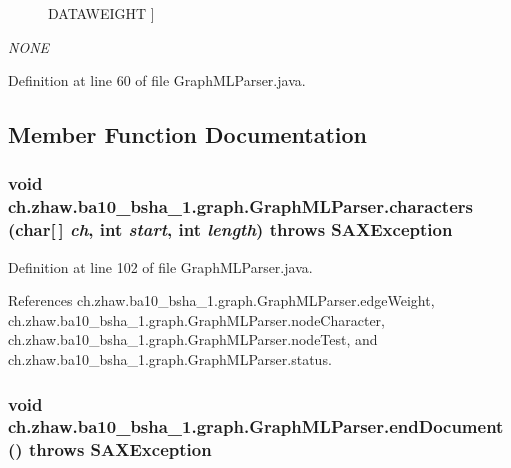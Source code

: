 \begin{Desc}
\begin{description}
{\hypertarget{classch_1_1zhaw_1_1ba10__bsha__1_1_1graph_1_1GraphMLParser_aaf3d4942a1edfa4a19addb2f2c0cdb9c}{
DATAWEIGHT}
\label{classch_1_1zhaw_1_1ba10__bsha__1_1_1graph_1_1GraphMLParser_aaf3d4942a1edfa4a19addb2f2c0cdb9c}
}]\item[{\em 
\hypertarget{classch_1_1zhaw_1_1ba10__bsha__1_1_1graph_1_1GraphMLParser_aaf3d4942a1edfa4a19addb2f2c0cdb9c}{
NONE}
\label{classch_1_1zhaw_1_1ba10__bsha__1_1_1graph_1_1GraphMLParser_aaf3d4942a1edfa4a19addb2f2c0cdb9c}
}]\end{description}
\end{Desc}



Definition at line 60 of file GraphMLParser.java.

\subsection{Member Function Documentation}
\hypertarget{classch_1_1zhaw_1_1ba10__bsha__1_1_1graph_1_1GraphMLParser_aaf97af9462bb91aabd817d1be6c32f6e}{
\subsubsection[{characters}]{\setlength{\rightskip}{0pt plus 5cm}void ch.zhaw.ba10\_\-bsha\_\-1.graph.GraphMLParser.characters (char\mbox{[}$\,$\mbox{]} {\em ch}, \/  int {\em start}, \/  int {\em length})  throws SAXException }}
\label{classch_1_1zhaw_1_1ba10__bsha__1_1_1graph_1_1GraphMLParser_aaf97af9462bb91aabd817d1be6c32f6e}


Definition at line 102 of file GraphMLParser.java.

References ch.zhaw.ba10\_\-bsha\_\-1.graph.GraphMLParser.edgeWeight, ch.zhaw.ba10\_\-bsha\_\-1.graph.GraphMLParser.nodeCharacter, ch.zhaw.ba10\_\-bsha\_\-1.graph.GraphMLParser.nodeTest, and ch.zhaw.ba10\_\-bsha\_\-1.graph.GraphMLParser.status.\hypertarget{classch_1_1zhaw_1_1ba10__bsha__1_1_1graph_1_1GraphMLParser_a644cce55a39c7d1acb1625b7903a6522}{
\subsubsection[{endDocument}]{\setlength{\rightskip}{0pt plus 5cm}void ch.zhaw.ba10\_\-bsha\_\-1.graph.GraphMLParser.endDocument ()  throws SAXException }}
\label{classch_1_1zhaw_1_1ba10__bsha__1_1_1graph_1_1GraphMLParser_a644cce55a39c7d1acb1625b7903a6522}


